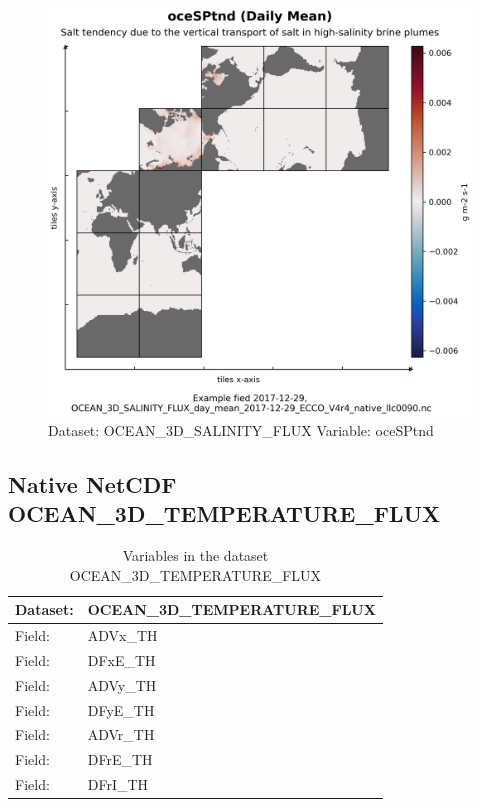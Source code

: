 \begin{figure}[H]
\centering
\includegraphics[width=\textwidth]{../images/plots/native_plots/Ocean_Three-Dimensional_Salinity_Fluxes/oceSPtnd.png}
\caption{Dataset: OCEAN\_3D\_SALINITY\_FLUX Variable: oceSPtnd}
\label{tab:table-OCEAN_3D_SALINITY_FLUX_oceSPtnd-Plot}
\end{figure}
\pagebreak
\subsection{Native NetCDF OCEAN\_3D\_TEMPERATURE\_FLUX}
\newp
\begin{longtable}{|p{}|p{}|}
\caption{Variables in the dataset OCEAN\_3D\_TEMPERATURE\_FLUX}
\label{tab:table-OCEAN_3D_TEMPERATURE_FLUX-fields} \\ 
\hline \endhead \hline \endfoot
\rowcolor{lightgray} \textbf{Dataset:} & \textbf{OCEAN\_3D\_TEMPERATURE\_FLUX} \\ \hline
Field: &ADVx\_TH \\ \hline
Field: &DFxE\_TH \\ \hline
Field: &ADVy\_TH \\ \hline
Field: &DFyE\_TH \\ \hline
Field: &ADVr\_TH \\ \hline
Field: &DFrE\_TH \\ \hline
Field: &DFrI\_TH \\ \hline
\end{longtable}

